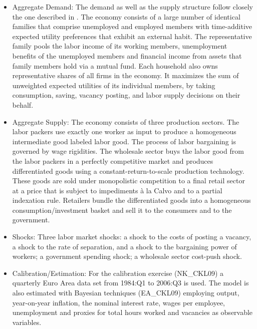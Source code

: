 \documentclass[11pt,a4paper]{article}
\begin{document}
	\begin{itemize}
		
		\item Aggregate Demand: The demand as well as the supply structure follow closely the one described in \cite{ChristoffelKuester2008}. The economy consists of a large number of identical families that comprise unemployed and employed members with time-additive expected utility preferences that exhibit an external habit. The representative family pools the labor income of its working members, unemployment benefits of the unemployed members and financial income from assets that family members hold via a mutual fund. Each household also owns representative shares of all firms in the economy. It maximizes the sum of unweighted expected utilities of its individual members, by taking consumption, saving, vacancy posting, and labor supply decisions on their behalf.
		
		\item Aggregate Supply: The economy consists of three production sectors. The labor packers use exactly one worker as input to produce a homogeneous intermediate good labeled labor good. The process of labor bargaining is governed by wage rigidities. The wholesale sector buys the labor good from the labor packers in a perfectly competitive market and produces differentiated goods using a constant-return-to-scale production technology. These goods are sold under monopolistic competition to a final retail sector at a price that is subject to impediments \`{a} la Calvo and to a partial indexation rule. Retailers bundle the differentiated goods into a homogeneous consumption/investment basket and sell it to the consumers and to the government.
		
		\item Shocks: Three labor market shocks: a shock to the costs of posting a vacancy, a shock to the rate of separation, and a shock to the bargaining power of workers; a government spending shock; a wholesale sector cost-push shock.
		
		\item Calibration/Estimation: For the calibration exercise (NK\_CKL09) a quarterly Euro Area data set from 1984:Q1 to 2006:Q3 is used. The model is also estimated with Bayesian techniques (EA\_CKL09) employing output, year-on-year inflation, the nominal interest rate, wages per employee, unemployment and proxies for total hours worked and vacancies as observable variables.
		
		
	\end{itemize}
	
\end{document}
